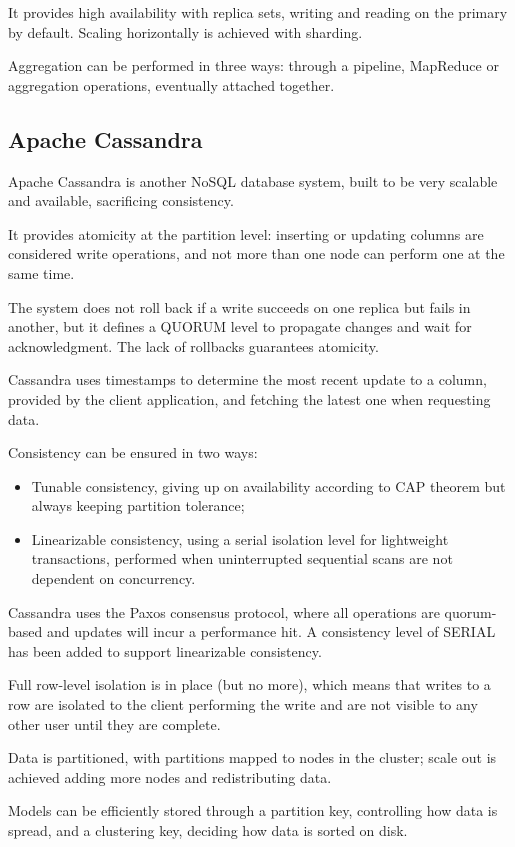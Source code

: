 It provides high availability with replica sets, writing and reading on the primary by default. Scaling horizontally is achieved with sharding.

Aggregation can be performed in three ways: through a pipeline, MapReduce or aggregation operations, eventually attached together.

\subsection{Apache Cassandra}
Apache Cassandra is another NoSQL database system, built to be very scalable and available, sacrificing consistency. 

It provides atomicity at the partition level: inserting or updating columns are considered write operations, and not more than one node can perform one at the same time.

The system does not roll back if a write succeeds on one replica but fails in another, but it defines a QUORUM level to propagate changes and wait for acknowledgment. The lack of rollbacks guarantees atomicity.

Cassandra uses timestamps to determine the most recent update to a column, provided by the client application, and fetching the latest one when requesting data.

Consistency can be ensured in two ways:
\begin{itemize}
	\item Tunable consistency, giving up on availability according to CAP theorem but always keeping partition tolerance;
	\item Linearizable consistency, using a serial isolation level for lightweight transactions, performed when uninterrupted sequential scans are not dependent on concurrency.
\end{itemize}

Cassandra uses the Paxos consensus protocol, where all operations are quorum-based and updates will incur a performance hit. A consistency level of SERIAL has been added to support linearizable consistency.

Full row-level isolation is in place (but no more), which means that writes to a row are isolated to the client performing the write and are not visible to any other user until they are complete.

Data is partitioned, with partitions mapped to nodes in the cluster; scale out is achieved adding more nodes and redistributing data. 

Models can be efficiently stored through a partition key, controlling how data is spread, and a clustering key, deciding how data is sorted on disk.
